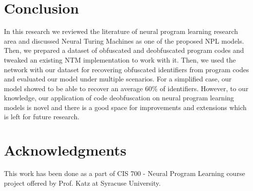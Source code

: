 \documentclass[acmsmall]{acmart}
\begin{document}
\section{Conclusion}
In this research we reviewed the literature of neural program learning research area and discussed Neural Turing Machines as one of the proposed NPL models. Then, we prepared a dataset of obfuscated and deobfuscated program codes and tweaked an existing NTM implementation to work with it. Then, we used the network with our dataset for recovering obfuscated identifiers from program codes and evaluated our model under multiple scenarios. For a simplified case, our model showed to be able to recover an average 60\% of identifiers. However, to our knowledge, our application of code deobfuscation on neural program learning models is novel and there is a good space for improvements and extensions which is left for future research.






\section{Acknowledgments}

This work has been done as a part of CIS 700 - Neural Program Learning course project offered by Prof. Katz at Syracuse University.
\end{document}
